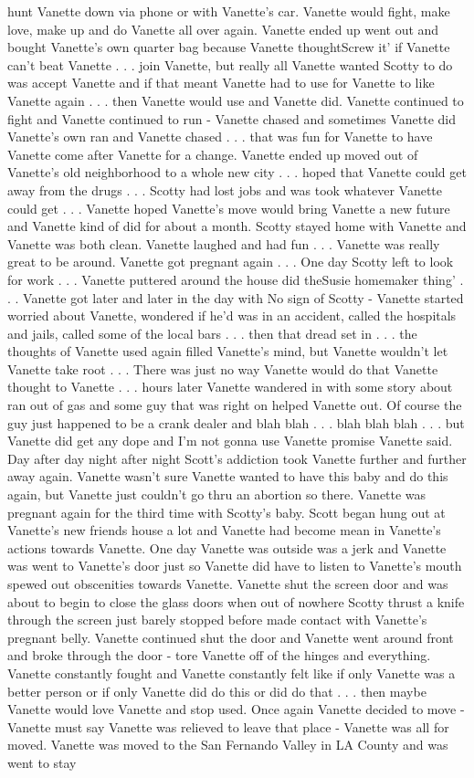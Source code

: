 \documentclass[12pt]{book}
\begin{document}
hunt Vanette down via phone or with Vanette's car. Vanette would fight, make love, make up and do Vanette all over again. Vanette ended up went out and bought Vanette's own quarter bag because Vanette thoughtScrew it' if Vanette can't beat Vanette  . . .  join Vanette, but really all Vanette wanted Scotty to do was accept Vanette and if that meant Vanette had to use for Vanette to like Vanette again  . . .  then Vanette would use and Vanette did. Vanette continued to fight and Vanette continued to run - Vanette chased and sometimes Vanette did Vanette's own ran and Vanette chased  . . .  that was fun for Vanette to have Vanette come after Vanette for a change. Vanette ended up moved out of Vanette's old neighborhood to a whole new city  . . .  hoped that Vanette could get away from the drugs  . . .  Scotty had lost jobs and was took whatever Vanette could get  . . .  Vanette hoped Vanette's move would bring Vanette a new future and Vanette kind of did for about a month. Scotty stayed home with Vanette and Vanette was both clean. Vanette laughed and had fun  . . .  Vanette was really great to be around. Vanette got pregnant again . . .  One day Scotty left to look for work  . . .  Vanette puttered around the house did theSusie homemaker thing'  . . .  Vanette got later and later in the day with No sign of Scotty - Vanette started worried about Vanette, wondered if he'd was in an accident, called the hospitals and jails, called some of the local bars  . . .  then that dread set in  . . .  the thoughts of Vanette used again filled Vanette's mind, but Vanette wouldn't let Vanette take root  . . .  There was just no way Vanette would do that Vanette thought to Vanette  . . .  hours later Vanette wandered in with some story about ran out of gas and some guy that was right on helped Vanette out. Of course the guy just happened to be a crank dealer and blah blah  . . .  blah blah blah  . . .  but Vanette did get any dope and I'm not gonna use Vanette promise Vanette said. Day after day night after night Scott's addiction took Vanette further and further away again. Vanette wasn't sure Vanette wanted to have this baby and do this again, but Vanette just couldn't go thru an abortion so there. Vanette was pregnant again for the third time with Scotty's baby. Scott began hung out at Vanette's new friends house a lot and Vanette had become mean in Vanette's actions towards Vanette. One day Vanette was outside was a jerk and Vanette was went to Vanette's door just so Vanette did have to listen to Vanette's mouth spewed out obscenities towards Vanette. Vanette shut the screen door and was about to begin to close the glass doors when out of nowhere Scotty thrust a knife through the screen just barely stopped before made contact with Vanette's pregnant belly. Vanette continued shut the door and Vanette went around front and broke through the door - tore Vanette off of the hinges and everything. Vanette constantly fought and Vanette constantly felt like if only Vanette was a better person or if only Vanette did do this or did do that  . . .  then maybe Vanette would love Vanette and stop used. Once again Vanette decided to move - Vanette must say Vanette was relieved to leave that place - Vanette was all for moved. Vanette was moved to the San Fernando Valley in LA County and was went to stay 
\end{document}
